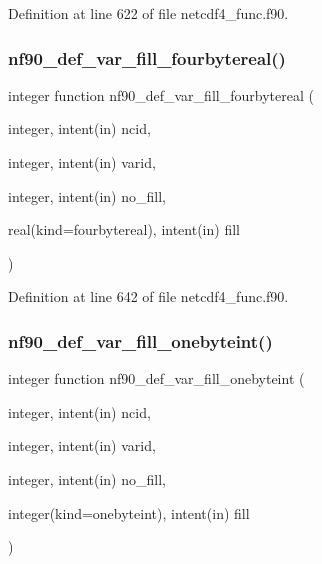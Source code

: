 Definition at line 622 of file netcdf4\+\_\+func.\+f90.

\mbox{\label{netcdf4__func_8f90_ad7f5ad944842ad43b2491db687804b85}} 
\subsubsection{\texorpdfstring{nf90\+\_\+def\+\_\+var\+\_\+fill\+\_\+fourbytereal()}{nf90\_def\_var\_fill\_fourbytereal()}}
{\footnotesize\ttfamily integer function nf90\+\_\+def\+\_\+var\+\_\+fill\+\_\+fourbytereal (\begin{DoxyParamCaption}\item[{integer, intent(in)}]{ncid,  }\item[{integer, intent(in)}]{varid,  }\item[{integer, intent(in)}]{no\+\_\+fill,  }\item[{real(kind=fourbytereal), intent(in)}]{fill }\end{DoxyParamCaption})}



Definition at line 642 of file netcdf4\+\_\+func.\+f90.

\mbox{\label{netcdf4__func_8f90_a76c26f620408ebc5943bf6430e0a02fc}} 
\subsubsection{\texorpdfstring{nf90\+\_\+def\+\_\+var\+\_\+fill\+\_\+onebyteint()}{nf90\_def\_var\_fill\_onebyteint()}}
{\footnotesize\ttfamily integer function nf90\+\_\+def\+\_\+var\+\_\+fill\+\_\+onebyteint (\begin{DoxyParamCaption}\item[{integer, intent(in)}]{ncid,  }\item[{integer, intent(in)}]{varid,  }\item[{integer, intent(in)}]{no\+\_\+fill,  }\item[{integer(kind=onebyteint), intent(in)}]{fill }\end{DoxyParamCaption})}



